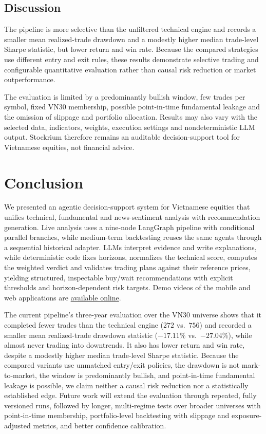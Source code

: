 \documentclass[runningheads]{llncs}
\begin{document}
\subsection{Discussion}
\label{sec:discussion}
The pipeline is more selective than the unfiltered technical engine and records a
smaller mean realized-trade drawdown and a modestly higher median trade-level
Sharpe statistic, but lower return and win rate. Because the compared strategies
use different entry and exit rules, these results demonstrate selective trading and
configurable quantitative evaluation rather than causal risk reduction or market
outperformance.

The evaluation is limited by a predominantly bullish window, few trades per symbol,
fixed VN30 membership, possible point-in-time fundamental leakage and the omission
of slippage and portfolio allocation. Results may also vary with the selected data,
indicators, weights, execution settings and nondeterministic LLM output. Stockrium
therefore remains an auditable decision-support tool for Vietnamese equities, not
financial advice.

\section{Conclusion}
\label{sec:conclusion}
We presented an agentic decision-support system for Vietnamese equities that
unifies technical, fundamental and news-sentiment analysis with recommendation
generation. Live analysis uses a nine-node LangGraph pipeline with conditional
parallel branches, while medium-term backtesting reuses the same agents through a
sequential historical adapter. LLMs interpret
evidence and write explanations, while deterministic code fixes horizons,
normalizes the technical score, computes the weighted verdict and validates
trading plans against their reference prices, yielding structured, inspectable
buy/wait recommendations with explicit thresholds and horizon-dependent risk
targets. Demo videos of the mobile and web applications are
\href{https://drive.google.com/drive/folders/1FN3j_Un-9gzbIFytVNeGLWqDyC-ZJYn8}{available online}.

The current pipeline's three-year evaluation over the VN30 universe shows that it
completed fewer trades than the technical engine ($272$ vs.\ $756$) and
recorded a smaller mean realized-trade drawdown statistic ($-17.11\%$ vs.\
$-27.04\%$), while almost never trading into downtrends. It also has lower return
and win rate, despite a modestly higher median trade-level Sharpe statistic. Because
the compared variants use unmatched entry/exit policies, the drawdown is not
mark-to-market, the window is predominantly bullish, and point-in-time fundamental
leakage is possible, we claim neither a causal risk reduction nor a statistically
established edge. Future work will extend the evaluation through repeated,
fully versioned runs, followed by longer, multi-regime tests over broader universes with
point-in-time membership, portfolio-level backtesting with slippage and
exposure-adjusted metrics, and better confidence calibration.
\end{document}
